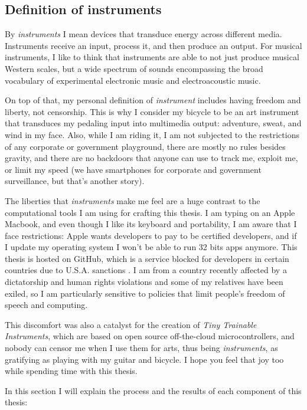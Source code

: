 \subsection{Definition of instruments}

By \emph{instruments} I mean devices that transduce energy across different media. Instruments receive an input, process it, and then produce an output. For musical instruments, I like to think that instruments are able to not just produce musical Western scales, but a wide spectrum of sounds encompassing the broad vocabulary of experimental electronic music and electroacoustic music.

On top of that, my personal definition of \emph{instrument} includes having freedom and liberty, not censorship. This is why I consider my bicycle to be an art instrument that transduces my pedaling input into multimedia output: adventure, sweat, and wind in my face. Also, while I am riding it, I am not subjected to the restrictions of any corporate or government playground, there are mostly no rules besides gravity, and there are no backdoors that anyone can use to track me, exploit me, or limit my speed (we have smartphones for corporate and government surveillance, but that's another story).

The liberties that \emph{instruments} make me feel are a huge contrast to the computational tools I am using for crafting this thesis. I am typing on an Apple Macbook, and even though I like its keyboard and portability, I am aware that I face restrictions: Apple wants developers to pay to be certified developers, and if I update my operating system I won't be able to run 32 bits apps anymore. This thesis is hosted on GitHub, which is a service blocked for developers in certain countries due to U.S.A. sanctions \cite{website-github-trade-controls}. I am from a country recently affected by a dictatorship and human rights violations and some of my relatives have been exiled, so I am particularly sensitive to policies that limit people's freedom of speech and computing.

This discomfort was also a catalyst for the creation of \textit{Tiny Trainable Instruments}, which are based on open source off-the-cloud microcontrollers, and nobody can censor me when I use them for arts, thus being \emph{instruments}, as gratifying as playing with my guitar and bicycle. I hope you feel that joy too while spending time with this thesis.

In this section I will explain the process and the results of each component of this thesis:

